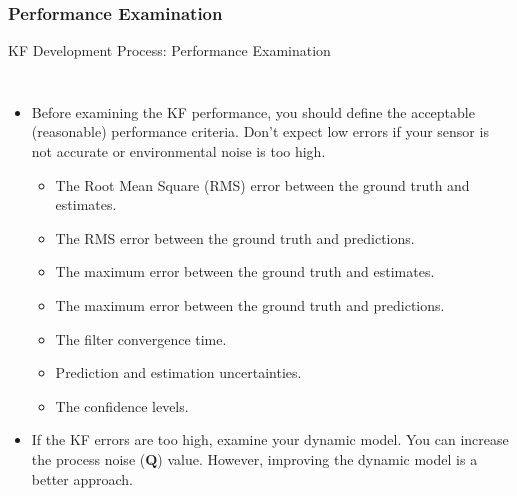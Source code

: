 \subsubsection{Performance Examination}
\begin{frame}{KF Development Process: Performance Examination}
\begin{columns}
    \begin{itemize}
        \item Before examining the KF performance, you should define the acceptable (reasonable) performance criteria. Don’t expect low errors if your sensor is not accurate or environmental noise is too high.
        \begin{itemize}
            \item The Root Mean Square (RMS) error between the ground truth and estimates.
            \item The RMS error between the ground truth and predictions.
            \item The maximum error between the ground truth and estimates.
            \item The maximum error between the ground truth and predictions.
            \item The filter convergence time.
            \item Prediction and estimation uncertainties.
            \item The confidence levels.
        \end{itemize}
    \item If the KF errors are too high, examine your dynamic model. You can increase the process noise ($\bm{Q}$) value. However, improving the dynamic model is a better approach.    
    \end{itemize}




\end{columns}
\end{frame}

